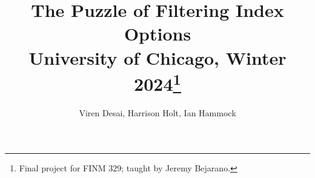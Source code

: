 \newcommand*{\MyHeaderPath}{.}%
\newcommand*{\PathToAssets}{../assets}%
\newcommand*{\PathToOutput}{../output}%
\newcommand*{\PathToBibFile}{bibliography.bib}%














\title{
The Puzzle of Filtering Index Options
\\{\color{blue} \large University of Chicago, Winter 2024\footnote{Final project for FINM 329; taught by Jeremy Bejarano.}}
}

\author{
Viren Desai, Harrison Holt, Ian Hammock 
}

